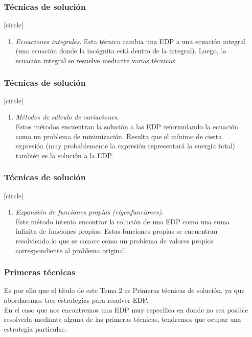 \begin{frame}
\frametitle{Técnicas de solución}
[circle]
\begin{enumerate}
\conti
\item \emph{Ecuaciones integrales}. Esta técnica cambia una EDP a una ecuación integral (una ecuación donde la incógnita está dentro de la integral). Luego, la ecuación integral se resuelve mediante varias técnicas.
\seti
\end{enumerate}
\end{frame}
\begin{frame}
\frametitle{Técnicas de solución}
[circle]
\begin{enumerate}
\conti
\item \emph{Métodos de cálculo de variaciones}.
\\
\bigskip
Estos métodos encuentran la solución a las EDP reformulando la ecuación como un problema de minimización. Resulta que el mínimo de cierta expresión (muy probablemente la expresión representará la energía total) también es la solución a la EDP.
\seti
\end{enumerate}
\end{frame}
\begin{frame}
\frametitle{Técnicas de solución}
[circle]
\begin{enumerate}
\conti
\item \emph{Expansión de funciones propias (eigenfunciones)}.
\\
\bigskip
Este método intenta encontrar la solución de una EDP como una suma infinita de funciones propias. Estas funciones propias se encuentran resolviendo lo que se conoce como un problema de valores propios correspondiente al problema original.
\end{enumerate}
\end{frame}
\begin{frame}
\frametitle{Primeras técnicas}
Es por ello que el título de este Tema 2 es Primeras técnicas de solución, ya que abordaremos tres estrategias para resolver EDP.
\\
\bigskip
\pause
En el caso que nos encontremos una EDP muy específica en donde no sea posible resolverla mediante alguna de las primeras técnicas, tendremos que ocupar una estrategia particular.
\end{frame}
